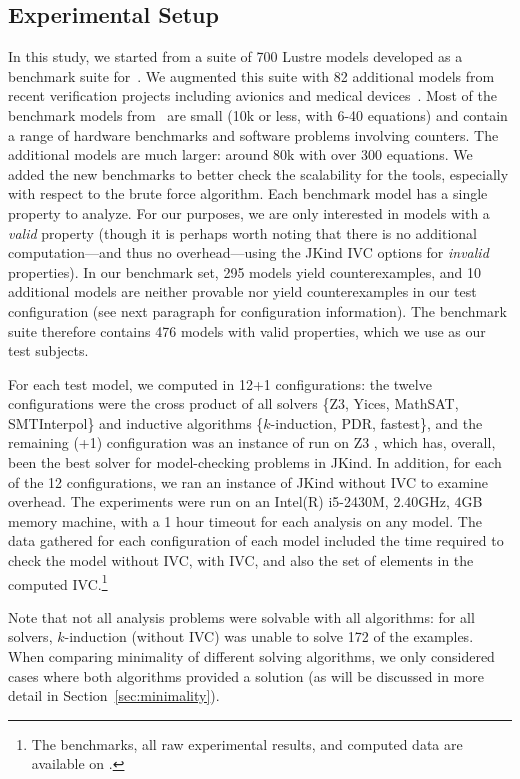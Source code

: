 \subsection{Experimental Setup}
In this study, we started from a suite of 700 Lustre models developed
as a benchmark suite for~\cite{Hagen08:FMCAD}. We augmented this suite
with 82 additional models from recent verification projects including
avionics and medical devices~\cite{QFCS15:backes,hilt2013}. Most of
the benchmark models from~\cite{Hagen08:FMCAD} are small (10k or less,
with 6-40 equations) and contain a range of hardware benchmarks and
software problems involving counters. The additional models are much
larger: around 80k with over 300 equations. We added the new
benchmarks to better check the scalability for the tools, especially
with respect to the brute force algorithm.
%
Each benchmark model has a single property to analyze.  For our purposes, we are only interested in models with a {\em valid} property (though it is perhaps worth noting that there is no additional computation---and thus no overhead---using the JKind IVC options for {\em invalid} properties).  In our benchmark set, 295 models yield counterexamples, and 10 additional models are neither provable nor yield counterexamples in our test configuration (see next paragraph for configuration information).  The benchmark suite therefore contains 476 models with valid properties, which we use as our test subjects.

For each test model, we computed \ucalg in 12+1 configurations: the
twelve configurations were the cross product of all solvers \{Z3,
Yices, MathSAT, SMTInterpol\} and inductive algorithms
\{$k$-induction, PDR, fastest\}, and the remaining (+1) configuration
was an instance of \bfalg run on Z3 ,
which has, overall, been the best solver for model-checking problems
in JKind. In addition, for each of the 12 configurations, we ran an
instance of JKind without IVC to examine overhead. The experiments
were run on an Intel(R) i5-2430M, 2.40GHz, 4GB memory machine, with a
1 hour timeout for each analysis on any model. The data gathered for
each configuration of each model included the time required to check
the model without IVC, with IVC, and also the set of elements in the
computed IVC.\footnote{The benchmarks, all raw experimental
  results, and computed data are available on \cite{expr}.}

Note that not all analysis problems were solvable with all algorithms: for all solvers, $k$-induction (without IVC) was unable to solve 172 of the examples.  When comparing minimality of different solving algorithms, we only considered cases where both algorithms provided a solution (as will be discussed in more detail in Section~\ref{sec:minimality}).

